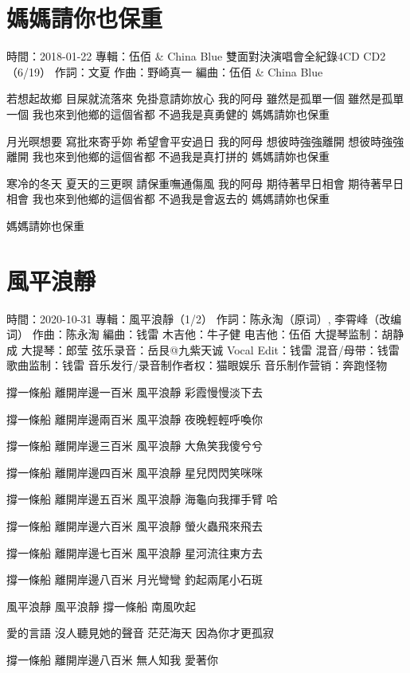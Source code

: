 \documentclass[UTF8,a4paper,oneside,twocolumn,12pt]{ctexbook}
\newcommand{\infopair}[2]{\textbullet #1：#2}
\newcommand{\zc}[1][伍佰]{\infopair{作詞}{#1}}
\newcommand{\zq}[1][伍佰]{\infopair{作曲}{#1}}
\newcommand{\bq}[1][伍佰]{\infopair{編曲}{#1}}
\newcommand{\zj}[1]{\infopair{專輯}{#1}}
\newcommand{\sj}[1]{\infopair{時間}{#1}}
\newenvironment{info}{\begin{flushleft}\kaishu
	}
	{\end{flushleft}\normalsize\yahei\par}
\newenvironment{lyric}{
	}
{}
\begin{document}
\section{媽媽請你也保重}
\begin{info}
	\sj{2018-01-22}
	\zj{伍佰 \& China Blue 雙面對決演唱會全紀錄4CD CD2（6/19）}
	\zc[文夏]
	\zq[野崎真一]
	\bq[伍佰 \& China Blue]
\end{info}
\begin{lyric}
	若想起故鄉 目屎就流落來
	免掛意請妳放心 我的阿母
	雖然是孤單一個 雖然是孤單一個
	我也來到他鄉的這個省都
	不過我是真勇健的
	媽媽請妳也保重

	月光暝想要 寫批來寄乎妳
	希望會平安過日 我的阿母
	想彼時強強離開 想彼時強強離開
	我也來到他鄉的這個省都
	不過我是真打拼的
	媽媽請妳也保重

	寒冷的冬天 夏天的三更暝
	請保重嘸通傷風 我的阿母
	期待著早日相會 期待著早日相會
	我也來到他鄉的這個省都
	不過我是會返去的
	媽媽請妳也保重

	媽媽請妳也保重
\end{lyric}

\section{風平浪靜}
\begin{info}
	\sj{2020-10-31}
	\zj{風平浪靜（1/2）}
	\zc[陈永淘（原词）, 李霄峰（改编词）]
	\zq[陈永淘]
	\bq[钱雷]
	\infopair{木吉他}{牛子健}
	\infopair{电吉他}{伍佰}
	\infopair{大提琴监制}{胡静成}
	\infopair{大提琴}{郎莹}
	\infopair{弦乐录音}{岳艮@九紫天诚}
	\infopair{Vocal Edit}{钱雷}
	\infopair{混音/母带}{钱雷}
	\infopair{歌曲监制}{钱雷}
	\infopair{音乐发行/录音制作者权}{猫眼娱乐}
	\infopair{音乐制作营销}{奔跑怪物}
\end{info}
\begin{lyric}
	撐一條船 離開岸邊一百米
	風平浪靜 彩霞慢慢淡下去

	撐一條船 離開岸邊兩百米
	風平浪靜 夜晚輕輕呼喚你

	撐一條船 離開岸邊三百米
	風平浪靜 大魚笑我傻兮兮

	撐一條船 離開岸邊四百米
	風平浪靜 星兒閃閃笑咪咪

	撐一條船 離開岸邊五百米
	風平浪靜 海龜向我揮手臂 哈

	撐一條船 離開岸邊六百米
	風平浪靜 螢火蟲飛來飛去

	撐一條船 離開岸邊七百米
	風平浪靜 星河流往東方去

	撐一條船 離開岸邊八百米
	月光彎彎 釣起兩尾小石斑

	風平浪靜 風平浪靜
	撐一條船 南風吹起

	愛的言語 沒人聽見她的聲音
	茫茫海天 因為你才更孤寂

	撐一條船 離開岸邊八百米
	無人知我 愛著你
\end{lyric}
\end{document}
